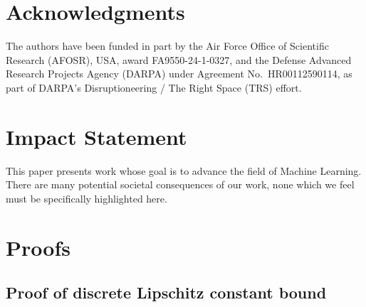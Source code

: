 \documentclass{article}
\theoremstyle{plain}
\theoremstyle{definition}
\theoremstyle{remark}
\begin{document}
\section*{Acknowledgments} 
The authors have been funded in part by the Air Force Office of Scientific Research (AFOSR), USA, award FA9550-24-1-0327, and the Defense Advanced Research Projects Agency (DARPA) under Agreement No.\ HR00112590114, as part of DARPA's Disruptioneering / The Right Space (TRS) effort. 

\section*{Impact Statement}
This paper presents work whose goal is to advance the field of Machine Learning. There are many potential societal consequences of our work, none which we feel must be specifically highlighted here.







\newpage
\appendix
\onecolumn
\section{Proofs}
\subsection{Proof of discrete Lipschitz constant bound}\label{sec:Proofs:Lipschitz}
\end{document}
